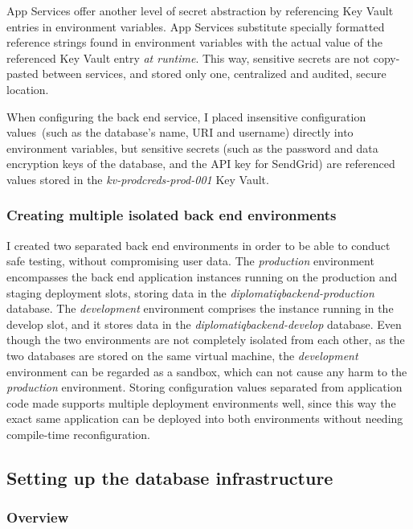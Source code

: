 App Services offer another level of secret abstraction by referencing Key Vault entries in environment variables. App Services substitute specially formatted reference strings found in environment variables with the actual value of the referenced Key Vault entry \emph{at runtime}. This way, sensitive secrets are not copy-pasted between services, and stored only one, centralized and audited, secure location.

When configuring the back end service, I placed insensitive configuration values (such as the database's name, URI and username) directly into environment variables, but sensitive secrets (such as the password and data encryption keys of the database, and the API key for SendGrid) are referenced values stored in the \emph{kv-prodcreds-prod-001} Key Vault.

\subsubsection{Creating multiple isolated back end environments}

I created two separated back end environments in order to be able to conduct safe testing, without compromising user data. The \emph{production} environment encompasses the back end application instances running on the production and staging deployment slots, storing data in the \emph{diplomatiqbackend-production} database. The \emph{development} environment comprises the instance running in the develop slot, and it stores data in the \emph{diplomatiqbackend-develop} database. Even though the two environments are not completely isolated from each other, as the two databases are stored on the same virtual machine, the \emph{development} environment can be regarded as a sandbox, which can not cause any harm to the \emph{production} environment. Storing configuration values separated from application code made supports multiple deployment environments well, since this way the exact same application can be deployed into both environments without needing compile-time reconfiguration.

\subsection{Setting up the database infrastructure}
\label{section:database}

\subsubsection{Overview}

